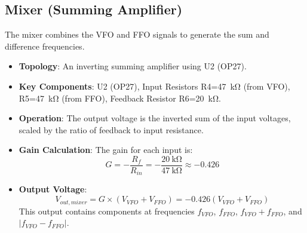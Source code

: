 \documentclass[conference]{IEEEtran}
\begin{document}
\subsection{Mixer (Summing Amplifier)}
The mixer combines the VFO and FFO signals to generate the sum and difference frequencies.
\begin{itemize}
    \item \textbf{Topology}: An inverting summing amplifier using U2 (OP27).
    \item \textbf{Key Components}: U2 (OP27), Input Resistors R4=\SI{47}{\kilo\ohm} (from VFO), R5=\SI{47}{\kilo\ohm} (from FFO), Feedback Resistor R6=\SI{20}{\kilo\ohm}.
    \item \textbf{Operation}: The output voltage is the inverted sum of the input voltages, scaled by the ratio of feedback to input resistance.
    \item \textbf{Gain Calculation}: The gain for each input is:
        \begin{equation}
            G = -\frac{R_f}{R_{in}} = -\frac{\SI{20}{\kilo\ohm}}{\SI{47}{\kilo\ohm}} \approx -0.426
        \end{equation}
    \item \textbf{Output Voltage}:
        \begin{equation}
            V_{out, mixer} = G \times (V_{VFO} + V_{FFO}) = -0.426 (V_{VFO} + V_{FFO})
        \end{equation}
        This output contains components at frequencies $f_{VFO}$, $f_{FFO}$, $f_{VFO}+f_{FFO}$, and $|f_{VFO}-f_{FFO}|$.
\end{itemize}
\end{document}
